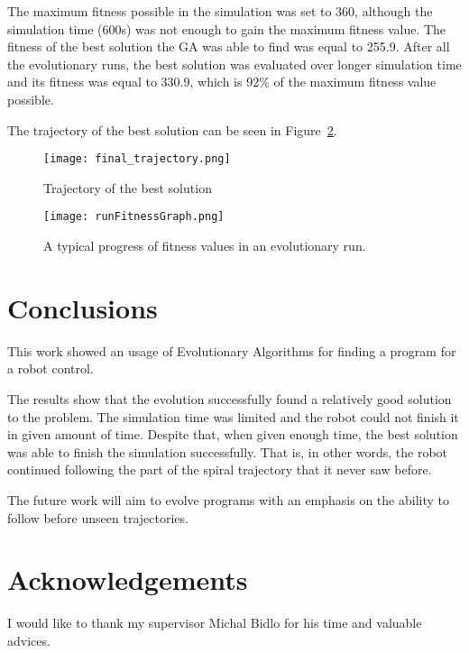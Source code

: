 \documentclass{ExcelAtFIT}
\begin{document}
The maximum fitness possible in the simulation was set to 360, although the simulation time (600s) was not enough to gain the maximum fitness value.
The fitness of the best solution the GA was able to find was equal to 255.9.
After all the evolutionary runs, the best solution was evaluated over longer simulation time and its fitness was equal to 330.9, which is 92\% of the maximum fitness value possible.

The trajectory of the best solution can be seen in Figure~\ref{fig:FitnessGraph}.

\begin{figure}[h]
	\centering
	{\texttt{[image: final\_trajectory.png]}}
	\caption{
		Trajectory of the best solution
	}
	\label{fig:FitnessGraph}
\end{figure}


\begin{figure}[h]
	\centering
	{\texttt{[image: runFitnessGraph.png]}}
	\caption{
		A typical progress of fitness values in an evolutionary run.
	}
	\label{fig:FitnessGraph}
\end{figure}


\section{Conclusions}
\label{sec:Conclusions}

This work showed an usage of Evolutionary Algorithms for finding a program for a robot control.

The results show that the evolution successfully found a relatively good solution to the problem.
The simulation time was limited and the robot could not finish it in given amount of time.
Despite that, when given enough time, the best solution was able to finish the simulation successfully.
That is, in other words, the robot continued following the part of the spiral trajectory that it never saw before.

The future work will aim to evolve programs with an emphasis on the ability to follow before unseen trajectories.


\section*{Acknowledgements}
I would like to thank my supervisor Michal Bidlo for his time and valuable advices.
\end{document}
